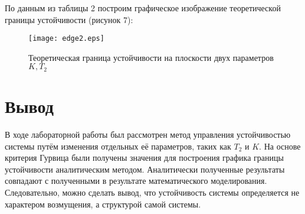 \documentclass[12pt,a4paper]{article}
\begin{document}
По данным из таблицы 2 построим графическое изображение теоретической границы устойчивости (рисунок 7):
\begin{figure}[H]
	\centering
	\texttt{[image: edge2.eps]}
	\caption{Теоретическая граница устойчивости на плоскости двух параметров $K, T_2$}
\end{figure}

\section*{Вывод}
В ходе лабораторной работы был рассмотрен метод управления устойчивостью системы путём изменения отдельных её параметров, таких как  $T_2$ и $K$.
На основе критерия Гурвица были получены значения для построения графика границы устойчивости аналитическим методом. Аналитически полученные результаты совпадают с полученными в результате математического моделирования.
Следовательно, можно сделать вывод, что устойчивость системы определяется не характером возмущения, а структурой самой системы.
\end{document}
